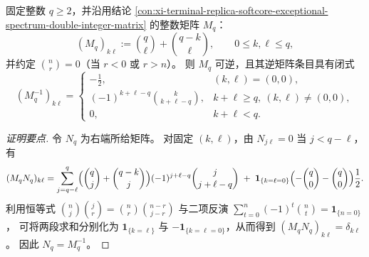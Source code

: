 \begin{theorem}\label{thm:xi-exceptional-integer-model-Mq-inverse-closed-form}
固定整数 \(q\ge 2\)，并沿用结论 \ref{con:xi-terminal-replica-softcore-exceptional-spectrum-double-integer-matrix} 的整数矩阵 \(M_q\)：
\[
(M_q)_{k\ell}:=\binom{q}{\ell}+\binom{q-k}{\ell},\qquad 0\le k,\ell\le q,
\]
并约定 \(\binom{n}{r}=0\)（当 \(r<0\) 或 \(r>n\)）。
则 \(M_q\) 可逆，且其逆矩阵条目具有闭式
\[
\boxed{\;
(M_q^{-1})_{k\ell}=
\begin{cases}
-\frac12, & (k,\ell)=(0,0),\\[4pt]
(-1)^{k+\ell-q}\binom{k}{k+\ell-q}, & k+\ell\ge q,\ (k,\ell)\neq(0,0),\\[4pt]
0, & k+\ell<q.
\end{cases}\;}
\]
\end{theorem}
\begin{proof}[证明要点]
令 \(N_q\) 为右端所给矩阵。
对固定 \((k,\ell)\)，由 \(N_{j\ell}=0\) 当 \(j<q-\ell\)，有
\[
(M_qN_q)_{k\ell}
=\sum_{j=q-\ell}^{q}\Bigl(\binom{q}{j}+\binom{q-k}{j}\Bigr)(-1)^{j+\ell-q}\binom{j}{j+\ell-q}
\;+\;\mathbf 1_{\{k=\ell=0\}}\Bigl(-\binom{q}{0}-\binom{q}{0}\Bigr)\frac12.
\]
利用恒等式 \(\binom{n}{j}\binom{j}{r}=\binom{n}{r}\binom{n-r}{j-r}\) 与二项反演
\(\sum_{t=0}^{n}(-1)^t\binom{n}{t}=\mathbf 1_{\{n=0\}}\)，
可将两段求和分别化为 \(\mathbf 1_{\{k=\ell\}}\) 与 \(-\mathbf 1_{\{k=\ell=0\}}\)，从而得到
\((M_qN_q)_{k\ell}=\delta_{k\ell}\)。
因此 \(N_q=M_q^{-1}\)。
\end{proof}

